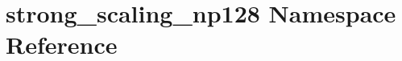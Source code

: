 \hypertarget{namespacestrong__scaling__np128}{}\section{strong\+\_\+scaling\+\_\+np128 Namespace Reference}
\label{namespacestrong__scaling__np128}
